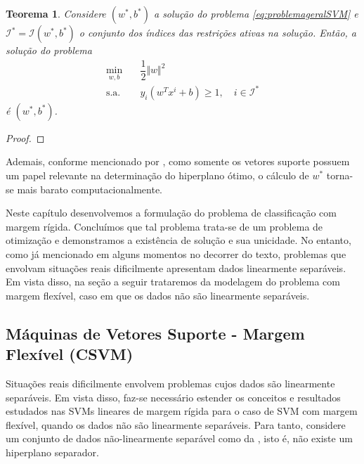 \documentclass[12pt,a4paper]{scrartcl}
\newtheorem{teo}{Teorema}
\theoremstyle{definition}%
\begin{document}
\begin{teo} \label{teo:vetores_suporte}
Considere $(w^{*}, b^{*})$ a solução do problema \eqref{eq:problemageralSVM} e $\mathcal{I}^{*} = \mathcal{I} (w^{*}, b^{*})$ o conjunto dos índices das restrições ativas na solução. Então, a solução do problema
\[
\begin{aligned}
\min_{w,b} & \quad \dfrac{1}{2} \Vert w\Vert^{2} \\
\text{s.a.} &  \quad y_i(w^{T}x^{i}+b) \geq 1, \quad i \in \mathcal{I}^{*}
\end{aligned}
\]
é $(w^{*}, b^{*})$.
\end{teo}
\begin{proof}

\end{proof}

Ademais, conforme mencionado por \textcite{Evelin2017}, como somente os vetores suporte possuem um papel relevante na determinação do hiperplano ótimo, o cálculo de $w^{*}$ torna-se mais barato computacionalmente.

Neste capítulo desenvolvemos a formulação do problema de classificação com margem rígida. Concluímos que tal problema trata-se de um problema de otimização e demonstramos a existência de solução e sua unicidade. No entanto, como já mencionado em alguns momentos no decorrer do texto, problemas que envolvam situações reais dificilmente apresentam dados linearmente separáveis. Em vista disso, na seção a seguir trataremos da modelagem do problema com margem flexível, caso em que os dados não são linearmente separáveis.


\subsection{Máquinas de Vetores Suporte - Margem Flexível (CSVM)}


Situações reais dificilmente envolvem problemas cujos dados são linearmente separáveis. Em vista disso, faz-se necessário estender os conceitos e resultados estudados nas SVMs lineares de margem rígida para o caso de SVM com margem flexível, quando os dados não são linearmente separáveis. Para tanto, considere um conjunto de dados não-linearmente separável como da , isto é, não existe um hiperplano separador. 
\end{document}

